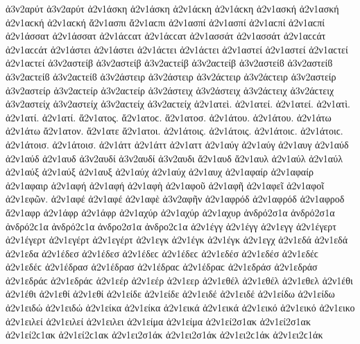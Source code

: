 {ἀ3ν2αρύτ ἀ3ν2αρύτ   %
ἀ2ν1άσκη ἀ2ν1άσκη ἀ2ν1άϲκη ἀ2ν1άϲκη   %
ἀ2ν1ασκή ἀ2ν1ασκή ἀ2ν1αϲκή ἀ2ν1αϲκή
ἄ2ν1ασπι ἄ2ν1αϲπι   %
ἀ2ν1ασπί ἀ2ν1ασπί ἀ2ν1αϲπί ἀ2ν1αϲπί
ἀ2ν1άσσατ ἀ2ν1άσσατ ἀ2ν1άϲϲατ ἀ2ν1άϲϲατ   %
ἀ2ν1ασσάτ ἀ2ν1ασσάτ ἀ2ν1αϲϲάτ ἀ2ν1αϲϲάτ
ἀ2ν1άστει ἀ2ν1άστει ἀ2ν1άϲτει ἀ2ν1άϲτει   %
ἀ2ν1αστεί ἀ2ν1αστεί ἀ2ν1αϲτεί ἀ2ν1αϲτεί
ἀ3ν2αστείβ ἀ3ν2αστείβ ἀ3ν2αϲτείβ ἀ3ν2αϲτείβ ἀ3ν2αστείϐ ἀ3ν2αστείϐ ἀ3ν2αϲτείϐ ἀ3ν2αϲτείϐ %
ἀ3ν2άστειρ ἀ3ν2άστειρ ἀ3ν2άϲτειρ ἀ3ν2άϲτειρ   %
ἀ3ν2αστείρ ἀ3ν2αστείρ ἀ3ν2αϲτείρ ἀ3ν2αϲτείρ
ἀ3ν2άστειχ ἀ3ν2άστειχ ἀ3ν2άϲτειχ ἀ3ν2άϲτειχ   %
ἀ3ν2αστείχ ἀ3ν2αστείχ ἀ3ν2αϲτείχ ἀ3ν2αϲτείχ
ἀ2ν1ατεὶ.   %
ἀ2ν1ατεί. ἀ2ν1ατεί.
ἀ2ν1ατὶ.   %
ἀ2ν1ατί. ἀ2ν1ατί.
ἄ2ν1ατος. ἄ2ν1ατοϲ.   %
ἄ2ν1ατοσ.
ἀ2ν1άτου. ἀ2ν1άτου.
ἀ2ν1άτω ἀ2ν1άτω
ἄ2ν1ατον.
ἄ2ν1ατε
ἄ2ν1ατοι.
ἀ2ν1άτοις. ἀ2ν1άτοις. ἀ2ν1άτοιϲ. ἀ2ν1άτοιϲ.
ἀ2ν1άτοισ. ἀ2ν1άτοισ.
ἀ2ν1άττ ἀ2ν1άττ   %
ἀ2ν1αττ
ἀ2ν1αύγ ἀ2ν1αύγ   %
ἀ2ν1αυγ
ἀ2ν1αύδ ἀ2ν1αύδ   %
ἀ2ν1αυδ
ἀ3ν2αυδί ἀ3ν2αυδί   %
ἀ3ν2αυδι
ἄ2ν1αυδ   %
ἄ2ν1αυλ   %
ἀ2ν1αύλ ἀ2ν1αύλ
ἀ2ν1αύξ ἀ2ν1αύξ   %
ἀ2ν1αυξ
ἀ2ν1αύχ ἀ2ν1αύχ   %
ἀ2ν1αυχ
ἀ2ν1αφαίρ ἀ2ν1αφαίρ   %
ἀ2ν1αφαιρ
ἀ2ν1αφή ἀ2ν1αφή   %
ἀ2ν1αφὴ
ἀ2ν1αφοῦ
ἀ2ν1αφῆ
ἀ2ν1αφεῖ
ἀ2ν1αφοῖ
ἀ2ν1εφῶν.
ἀ2ν1αφέ ἀ2ν1αφέ
ἀ2ν1αφὲ
ἀ3ν2αφῆν   %
ἀ2ν1αφρόδ ἀ2ν1αφρόδ   %
ἀ2ν1αφροδ
ἄ2ν1αφρ   %
ἀ2ν1άφρ ἀ2ν1άφρ
ἀ2ν1αχύρ ἀ2ν1αχύρ   %
ἀ2ν1αχυρ
ἀνδρό2σ1α ἀνδρό2σ1α ἀνδρό2ϲ1α ἀνδρό2ϲ1α   %
ἀνδρο2σ1α ἀνδρο2ϲ1α
ἀ2ν1έγγ ἀ2ν1έγγ   %
ἀ2ν1εγγ
ἀ2ν1έγερτ ἀ2ν1έγερτ   %
ἀ2ν1εγέρτ ἀ2ν1εγέρτ
ἀ2ν1εγκ   %
ἀ2ν1έγκ ἀ2ν1έγκ   %
ἀ2ν1εγχ   %
ἀ2ν1εδά ἀ2ν1εδά   %
ἀ2ν1εδα
ἀ2ν1έδεσ ἀ2ν1έδεσ ἀ2ν1έδεϲ ἀ2ν1έδεϲ   %
ἀ2ν1εδέσ ἀ2ν1εδέσ ἀ2ν1εδέϲ ἀ2ν1εδέϲ
ἀ2ν1έδρασ ἀ2ν1έδρασ ἀ2ν1έδραϲ ἀ2ν1έδραϲ   %
ἀ2ν1εδράσ ἀ2ν1εδράσ ἀ2ν1εδράϲ ἀ2ν1εδράϲ
ἀ2ν1εέρ ἀ2ν1εέρ   %
ἀ2ν1εερ
ἀ2ν1εθέλ ἀ2ν1εθέλ   %
ἀ2ν1εθελ
ἀ2ν1έθι ἀ2ν1έθι   %
ἀ2ν1εθί ἀ2ν1εθί
ἀ2ν1είδε ἀ2ν1είδε   %
ἀ2ν1ειδέ ἀ2ν1ειδέ
ἀ2ν1είδω ἀ2ν1είδω   %
ἀ2ν1ειδώ ἀ2ν1ειδώ
ἀ2ν1είκα ἀ2ν1είκα   %
ἀ2ν1εικά ἀ2ν1εικά
ἀ2ν1εικό ἀ2ν1εικό   %
ἀ2ν1εικο
ἀ2ν1ειλεί ἀ2ν1ειλεί   %
ἀ2ν1ειλει
ἀ2ν1είμα ἀ2ν1είμα   %
ἀ2ν1εί2σ1ακ ἀ2ν1εί2σ1ακ ἀ2ν1εί2ϲ1ακ ἀ2ν1εί2ϲ1ακ   %
ἀ2ν1ει2σ1άκ ἀ2ν1ει2σ1άκ ἀ2ν1ει2ϲ1άκ ἀ2ν1ει2ϲ1άκ
}

